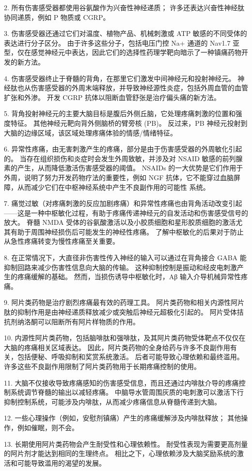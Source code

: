 2. 所有伤害感受器都使用谷氨酸作为兴奋性神经递质； 许多还表达兴奋性神经肽协同递质，例如 P 物质或 CGRP。 

3. 伤害感受器还通过它们对温度、植物产品、机械刺激或 ATP 敏感的不同受体的表达进行分子区分。 
由于许多这些分子，包括电压门控 Na+ 通道的 Nav1.7 亚型，仅在感觉神经元中表达，因此它们的选择性药理学靶向暗示了一种镇痛药物开发的新方法。 


4. 伤害感受器终止于脊髓的背角，在那里它们激发中间神经元和投射神经元。 
神经肽也从伤害感受器的外周末端释放，并导致神经源性炎症，包括外周血管的血管扩张和外渗。 
开发 CGRP 抗体以阻断血管舒张是治疗偏头痛的新方法。 


5. 背角投射神经元的主要大脑目标是腹后外侧丘脑，它处理疼痛刺激的位置和强度特征。 
其他神经元靶向背外侧脑桥的臂旁核 (PB)。 
反过来，PB 神经元投射到大脑的边缘区域，该区域处理疼痛体验的情感/情绪特征。
 

6. 异常性疼痛，由无害刺激产生的疼痛，部分是由于伤害感受器的外周敏化引起的。 
当存在组织损伤和炎症时会发生外周致敏，并涉及对 NSAID 敏感的前列腺素的产生，从而降低激活伤害感受器的阈值。 
NSAIDs 的一大优势是它们作用于外周，说明了努力开发药物疗法的重要性，例如 NGF 抗体，它不能穿过血脑屏障，从而减少它们在中枢神经系统中产生不良副作用的可能性 系统。 


7. 痛觉过敏（对疼痛刺激的反应加剧疼痛）和异常性疼痛也由背角活动改变引起——这是一种中枢敏化过程，有助于疼痛传递神经元的自发活动和伤害感受信号的放大。 
脊髓 NMDA 受体的谷氨酸激活以及小胶质细胞和星形胶质细胞的激活尤其有助于周围神经损伤后可能发生的神经性疼痛。 
了解中枢敏化的后果对于防止从急性疼痛转变为慢性疼痛至关重要。 


8. 在正常情况下，大直径非伤害性传入神经的输入可以通过在背角接合 GABA 能抑制回路来减少伤害性信息向大脑的传输。 
这种抑制控制是振动和经皮电刺激产生的疼痛缓解的基础。 
然而，当损伤诱导中枢敏化时，Aβ 输入介导机械异常性疼痛。
 

9. 阿片类药物是治疗剧烈疼痛最有效的药理工具。 
阿片类药物和相关内源性阿片肽的抑制作用是由神经递质释放减少或突触后神经元超极化引起的。 
阿片受体拮抗剂纳洛酮可以阻断所有阿片样物质的作用。 


10. 内源性阿片类药物，包括脑啡肽和强啡肽，及其阿片类药物受体靶点不仅仅在大脑的疼痛相关区域表达。
因此，阿片类药物的全身给药与许多不良副作用有关，包括便秘、呼吸抑制和奖赏系统激活。 
后者可能导致心理依赖和最终滥用。
许多这些不良副作用限制了阿片类药物用于长期疼痛控制的使用。


11. 大脑不仅接收导致疼痛感知的伤害感受信息，而且还通过内啡肽介导的疼痛控制系统调节脊髓的输出以减轻疼痛。 
中脑导水管周围灰质的电刺激可以激活下行抑制控制系统，可能涉及内啡肽，从而减少疼痛信息从脊髓传递到大脑。


12. 一些心理操作（例如，安慰剂镇痛）产生的疼痛缓解涉及内啡肽释放；
其他操作，例如催眠，则不会。


13. 长期使用阿片类药物会产生耐受性和心理依赖性。 
耐受性表现为需要更高剂量的阿片剂才能达到相同的生理终点。 
相比之下，心理依赖涉及大脑奖励系统的激活和可能导致滥用的渴望的发展。



